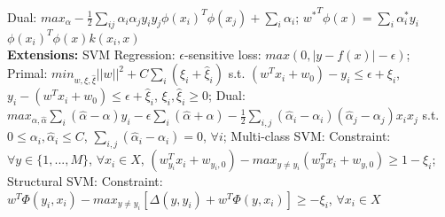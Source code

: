 Dual: $max_{\alpha}-\frac{1}{2}\sum_{ij}\alpha_i \alpha_j y_i y_j \phi(x_{i})^{T}\phi(x_{j}) + \sum_{i}\alpha_i$; ${w^{*}}^{T}\phi(x) = \sum_{i} \alpha_{i}^{*}y_i$\sout{$\phi(x_{i})^{T}\phi(x)$}$k(x_i, x)$ \\
\textbf{Extensions: } 
SVM Regression: $\epsilon$-sensitive loss: $max(0, |y - f(x)| - \epsilon)$; Primal: $min_{w, \xi, \hat{\xi}} ||w||^{2} + C \sum_{i}(\xi_{i} + \hat{\xi}_{i})$ s.t. $(w^T x_i + w_0) - y_i \leq \epsilon + \xi_i$, $y_i - (w^T x_i + w_0) \leq \epsilon + \hat{\xi}_{i}$, $\xi_{i}, \hat{\xi}_{i} \geq 0$; Dual: $max_{\alpha, \hat{\alpha}}\sum_i (\hat{\alpha} - \alpha)y_i - \epsilon\sum_i (\hat{\alpha} + \alpha) - \frac{1}{2}\sum_{i, j}(\hat{\alpha}_{i} - \alpha_{i})(\hat{\alpha}_{j} - \alpha_{j})x_i x_j$ s.t. $0 \leq \alpha_i, \hat{\alpha}_{i} \leq C$, $\sum_{i, j}(\hat{\alpha}_{i} - \alpha_{i}) = 0$, $\forall i$;
Multi-class SVM: Constraint: $\forall y \in \{1, ..., M\}$, $\forall x_i \in X$, $(w_{y_i}^{T}x_i + w_{y_i, 0}) - max_{y \neq y_i}(w_{y}^{T}x_i + w_{y, 0}) \geq 1 - \xi_i$; Structural SVM: Constraint: $w^T \Phi(y_i, x_i) - max_{y \neq y_i}[\Delta(y, y_i) + w^T \Phi(y, x_i)] \geq -\xi_i$, $\forall x_i \in X$